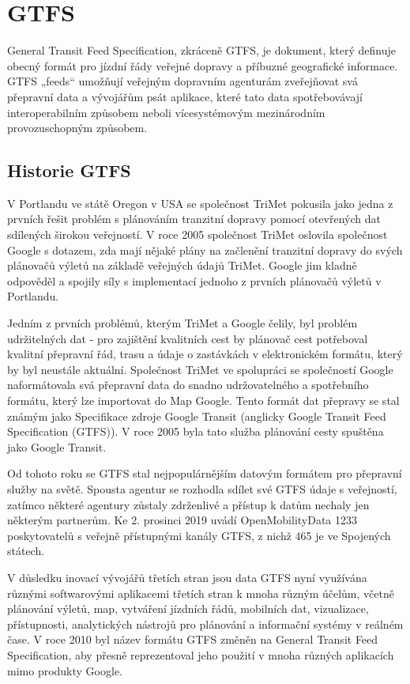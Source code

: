 \chapter{GTFS}
\label{2-teorie-gtfs}

General Transit Feed Specification, zkráceně GTFS, je dokument, který definuje
obecný formát pro jízdní řády veřejné dopravy a příbuzné geografické informace.
GTFS „feeds“ umožňují veřejným dopravním agenturám zveřejňovat svá přepravní
data a vývojářům psát aplikace, které tato data spotřebovávají interoperabilním
způsobem neboli vícesystémovým mezinárodním provozuschopným způsobem. \cite{gtfs-info}

\section{Historie GTFS}
V Portlandu ve státě Oregon v USA se společnost TriMet pokusila jako jedna z prvních 
řešit problém s plánováním tranzitní dopravy pomocí otevřených dat sdílených širokou veřejností.
V roce 2005 společnost TriMet oslovila společnost Google s dotazem, zda mají nějaké plány
na začlenění tranzitní dopravy do svých plánovačů výletů na základě veřejných údajů TriMet.
Google jim kladně odpověděl a spojily síly s implementací jednoho z prvních plánovačů výletů v Portlandu.

Jedním z prvních problémů, kterým TriMet a Google čelily, byl problém udržitelných dat 
- pro zajištění kvalitních cest by plánovač cest potřeboval kvalitní přepravní řád, 
trasu a údaje o zastávkách v elektronickém formátu, který by byl neustále aktuální. 
Společnost TriMet ve spolupráci se společností Google naformátovala svá přepravní 
data do snadno udržovatelného a spotřebního formátu, který lze importovat do Map Google. 
Tento formát dat přepravy se stal známým jako Specifikace zdroje Google Transit (anglicky
Google Transit Feed Specification (GTFS)). 
V roce 2005 byla tato služba plánování cesty spuštěna jako Google Transit.

Od tohoto roku se GTFS stal nejpopulárnějším datovým formátem pro přepravní služby na světě. 
Spousta agentur se rozhodla sdílet své GTFS údaje s veřejností, zatímco některé agentury 
zůstaly zdrženlivé a přístup k datům nechaly jen některým partnerům. Ke 2. prosinci 2019
uvádí OpenMobilityData 1233 poskytovatelů s veřejně přístupnými kanály GTFS,
z nichž 465 je ve Spojených státech. 

V důsledku inovací vývojářů třetích stran jsou data GTFS nyní využívána různými softwarovými aplikacemi
třetích stran k mnoha různým účelům, včetně plánování výletů, map, vytváření jízdních řádů, mobilních dat,
vizualizace, přístupnosti, analytických nástrojů pro plánování a informační systémy v reálném čase.
V roce 2010 byl název formátu GTFS změněn na General Transit Feed Specification,
aby přesně reprezentoval jeho použití v mnoha různých aplikacích mimo produkty Google. \cite{transitwiki} 
 
